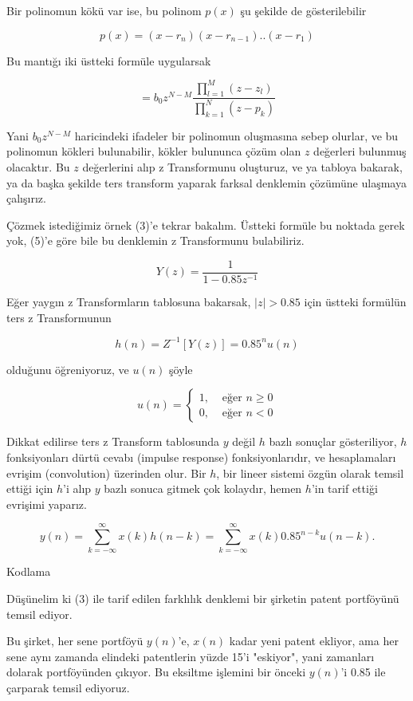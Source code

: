 \documentclass[12pt,fleqn]{article}\usepackage{../../common}
\begin{document}
Bir polinomun kökü var ise, bu polinom $p(x)$ şu şekilde de gösterilebilir

$$ p(x) = (x-r_n)(x-r_{n-1})..(x-r_1) $$

Bu mantığı iki üstteki formüle uygularsak 

$$ = b_0 z^{N - M} 
\frac{\prod_{l=1}^{M}(z-z_l)}{ \prod_{k=1}^{N}(z-p_k) }
$$

Yani $b_0z^{N-M}$ haricindeki ifadeler bir polinomun oluşmasına sebep olurlar,
ve bu polinomun kökleri bulunabilir, kökler bulununca çözüm olan $z$ değerleri
bulunmuş olacaktır. Bu $z$ değerlerini alıp z Transformunu oluşturuz, ve ya
tabloya bakarak, ya da başka şekilde ters transform yaparak farksal denklemin
çözümüne ulaşmaya çalışırız.

Çözmek istediğimiz örnek (3)'e tekrar bakalım. Üstteki formüle bu noktada
gerek yok, (5)'e göre bile bu denklemin z Transformunu bulabiliriz. 

$$ Y(z) = \frac{1}{1-0.85z^{-1}} $$

Eğer yaygın z Transformların tablosuna bakarsak, $|z|>0.85$ için üstteki
formülün ters z Transformunun 

$$ h(n) = Z^{-1} [Y(z)] = 0.85^nu(n) $$

olduğunu öğreniyoruz, ve $u(n)$ şöyle 

$$
u(n) = 
\left\{ \begin{array}{ll}
1, & \textrm{ eğer } n \ge 0 \\ 
0, & \textrm{ eğer } n < 0
\end{array} \right.
$$

Dikkat edilirse ters z Transform tablosunda $y$ değil $h$ bazlı sonuçlar
gösteriliyor, $h$ fonksiyonları dürtü cevabı (impulse response)
fonksiyonlarıdır, ve hesaplamaları evrişim (convolution) üzerinden
olur. Bir $h$, bir lineer sistemi özgün olarak temsil ettiği için $h$'i
alıp $y$ bazlı sonuca gitmek çok kolaydır, hemen $h$'in tarif ettiği
evrişimi yaparız.

$$ y(n) = \sum_{k=-\infty}^\infty x(k) h(n-k) = \sum_{k=-\infty}^\infty x(k) 0.85^{n-k} u(n-k). $$ 

Kodlama

Düşünelim ki (3) ile tarif edilen farklılık denklemi bir şirketin patent
portföyünü temsil ediyor. 

Bu şirket, her sene portföyü $y(n)$'e, $x(n)$ kadar yeni patent ekliyor,
ama her sene aynı zamanda elindeki patentlerin yüzde 15'i "eskiyor", yani
zamanları dolarak portföyünden çıkıyor. Bu eksiltme işlemini bir önceki
$y(n)$'i 0.85 ile çarparak temsil ediyoruz. 
\end{document}
